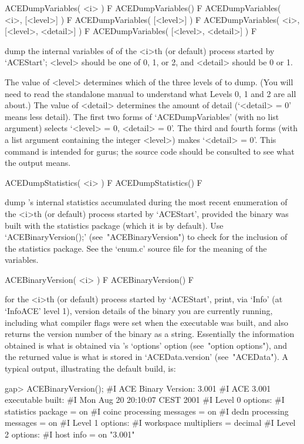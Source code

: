 \>ACEDumpVariables( <i> ) F
\>ACEDumpVariables() F
\>ACEDumpVariables( <i>, [<level>] ) F
\>ACEDumpVariables( [<level>] ) F
\>ACEDumpVariables( <i>, [<level>, <detail>] ) F
\>ACEDumpVariables( [<level>, <detail>] ) F

dump the internal variables  of  {\ACE}  of  the  <i>th  (or  default)
process started by `ACEStart'; <level> should be one of 0,  1,  or  2,
and <detail> should be 0 or 1.

The value of <level> determines which of the three levels of {\ACE} to
dump. (You will need to read the standalone manual to understand  what
Levels 0, 1 and 2 are all about.) The value of <detail> determines the
amount of detail (`<detail> = 0' means less  detail).  The  first  two
forms of `ACEDumpVariables' (with no list argument) selects `<level> =
0, <detail> = 0'. The third and fourth forms  (with  a  list  argument
containing the integer <level>) makes `<detail> = 0'. This command  is
intended for gurus; the source code should be consulted  to  see  what
the output means.

\>ACEDumpStatistics( <i> ) F
\>ACEDumpStatistics() F

dump {\ACE}'s internal statistics accumulated during the  most  recent
enumeration of the <i>th (or default) process started  by  `ACEStart',
provided the {\ACE} binary  was  built  with  the  statistics  package
(which    it    is    by    default).    Use     `ACEBinaryVersion();'
(see~"ACEBinaryVersion") to check for the inclusion of the  statistics
package.  See  the  `enum.c'  source  file  for  the  meaning  of  the
variables.

\>ACEBinaryVersion( <i> ) F
\>ACEBinaryVersion() F

for the <i>th (or default) process started by `ACEStart',  print,  via
`Info' (at `InfoACE' level 1), version details of  the  {\ACE}  binary
you are currently running, including what compiler flags were set when
the executable was built, and also returns the version number  of  the
binary as a string. Essentially the information obtained  is  what  is
obtained via {\ACE}'s `options' option (see~"option options"), and the
returned value is what is stored in `ACEData.version' (see~"ACEData").
A typical output, illustrating the default build, is:

\beginexample
gap> ACEBinaryVersion();
#I  ACE Binary Version: 3.001
#I  ACE 3.001 executable built:
#I    Mon Aug 20 20:10:07 CEST 2001
#I  Level 0 options:
#I    statistics package = on
#I    coinc processing messages = on
#I    dedn processing messages = on
#I  Level 1 options:
#I    workspace multipliers = decimal
#I  Level 2 options:
#I    host info = on
"3.001"
\endexample

